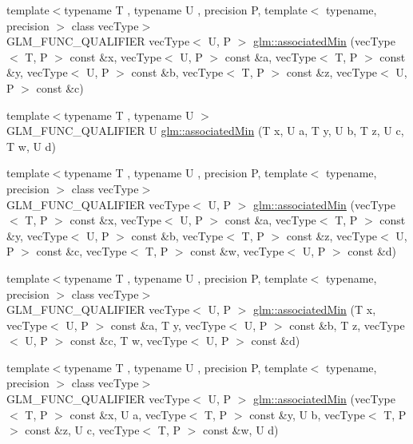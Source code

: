 \begin{DoxyCompactItemize}
\item 
{\footnotesize template$<$typename T , typename U , precision P, template$<$ typename, precision $>$ class vec\-Type$>$ }\\G\-L\-M\-\_\-\-F\-U\-N\-C\-\_\-\-Q\-U\-A\-L\-I\-F\-I\-E\-R vec\-Type$<$ U, P $>$ \hyperlink{group__gtx__associated__min__max_ga5bc6b9acbf9e060d58a342fbe3b73d43}{glm\-::associated\-Min} (vec\-Type$<$ T, P $>$ const \&x, vec\-Type$<$ U, P $>$ const \&a, vec\-Type$<$ T, P $>$ const \&y, vec\-Type$<$ U, P $>$ const \&b, vec\-Type$<$ T, P $>$ const \&z, vec\-Type$<$ U, P $>$ const \&c)
\item 
{\footnotesize template$<$typename T , typename U $>$ }\\G\-L\-M\-\_\-\-F\-U\-N\-C\-\_\-\-Q\-U\-A\-L\-I\-F\-I\-E\-R U \hyperlink{group__gtx__associated__min__max_ga432224ebe2085eaa2b63a077ecbbbff6}{glm\-::associated\-Min} (T x, U a, T y, U b, T z, U c, T w, U d)
\item 
{\footnotesize template$<$typename T , typename U , precision P, template$<$ typename, precision $>$ class vec\-Type$>$ }\\G\-L\-M\-\_\-\-F\-U\-N\-C\-\_\-\-Q\-U\-A\-L\-I\-F\-I\-E\-R vec\-Type$<$ U, P $>$ \hyperlink{group__gtx__associated__min__max_ga88e031f22b80215505928900d3dde549}{glm\-::associated\-Min} (vec\-Type$<$ T, P $>$ const \&x, vec\-Type$<$ U, P $>$ const \&a, vec\-Type$<$ T, P $>$ const \&y, vec\-Type$<$ U, P $>$ const \&b, vec\-Type$<$ T, P $>$ const \&z, vec\-Type$<$ U, P $>$ const \&c, vec\-Type$<$ T, P $>$ const \&w, vec\-Type$<$ U, P $>$ const \&d)
\item 
{\footnotesize template$<$typename T , typename U , precision P, template$<$ typename, precision $>$ class vec\-Type$>$ }\\G\-L\-M\-\_\-\-F\-U\-N\-C\-\_\-\-Q\-U\-A\-L\-I\-F\-I\-E\-R vec\-Type$<$ U, P $>$ \hyperlink{group__gtx__associated__min__max_ga0f63b0dce5a5c3242cc6d9847e7d14f1}{glm\-::associated\-Min} (T x, vec\-Type$<$ U, P $>$ const \&a, T y, vec\-Type$<$ U, P $>$ const \&b, T z, vec\-Type$<$ U, P $>$ const \&c, T w, vec\-Type$<$ U, P $>$ const \&d)
\item 
{\footnotesize template$<$typename T , typename U , precision P, template$<$ typename, precision $>$ class vec\-Type$>$ }\\G\-L\-M\-\_\-\-F\-U\-N\-C\-\_\-\-Q\-U\-A\-L\-I\-F\-I\-E\-R vec\-Type$<$ U, P $>$ \hyperlink{group__gtx__associated__min__max_ga00a949fd345f4b31b259f033d3ab4a1c}{glm\-::associated\-Min} (vec\-Type$<$ T, P $>$ const \&x, U a, vec\-Type$<$ T, P $>$ const \&y, U b, vec\-Type$<$ T, P $>$ const \&z, U c, vec\-Type$<$ T, P $>$ const \&w, U d)

\end{DoxyCompactItemize}
